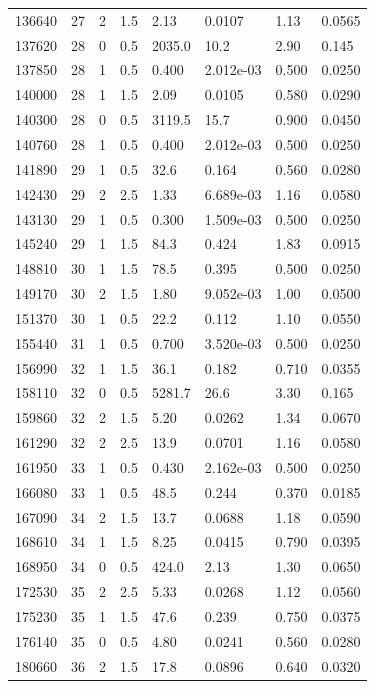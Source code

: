 \documentclass[preview]{standalone}
\begin{document}
{{{\begin{tabular}{L{1.2cm}C{1.2cm} C{0.3cm}C{0.5cm} C{1.4cm}C{1.4cm} C{1.4cm}C{1.4cm}}
  136640  &    27  & 2     & 1.5 &  2.13  & 0.0107  & 1.13 &  0.0565   \\ 
  137620  &    28  & 0     & 0.5 &  2035.0  & 10.2  & 2.90 &  0.145   \\ 
  137850  &    28  & 1     & 0.5 &  0.400  & 2.012e-03  & 0.500 &  0.0250   \\ 
  140000  &    28  & 1     & 1.5 &  2.09  & 0.0105  & 0.580 &  0.0290   \\ 
  140300  &    28  & 0     & 0.5 &  3119.5  & 15.7  & 0.900 &  0.0450   \\ 
  140760  &    28  & 1     & 0.5 &  0.400  & 2.012e-03  & 0.500 &  0.0250   \\ 
  141890  &    29  & 1     & 0.5 &  32.6  & 0.164  & 0.560 &  0.0280   \\ 
  142430  &    29  & 2     & 2.5 &  1.33  & 6.689e-03  & 1.16 &  0.0580   \\ 
  143130  &    29  & 1     & 0.5 &  0.300  & 1.509e-03  & 0.500 &  0.0250   \\ 
  145240  &    29  & 1     & 1.5 &  84.3  & 0.424  & 1.83 &  0.0915   \\ 
  148810  &    30  & 1     & 1.5 &  78.5  & 0.395  & 0.500 &  0.0250   \\ 
  149170  &    30  & 2     & 1.5 &  1.80  & 9.052e-03  & 1.00 &  0.0500   \\ 
  151370  &    30  & 1     & 0.5 &  22.2  & 0.112  & 1.10 &  0.0550   \\ 
  155440  &    31  & 1     & 0.5 &  0.700  & 3.520e-03  & 0.500 &  0.0250   \\ 
  156990  &    32  & 1     & 1.5 &  36.1  & 0.182  & 0.710 &  0.0355   \\ 
  158110  &    32  & 0     & 0.5 &  5281.7  & 26.6  & 3.30 &  0.165   \\ 
  159860  &    32  & 2     & 1.5 &  5.20  & 0.0262  & 1.34 &  0.0670   \\ 
  161290  &    32  & 2     & 2.5 &  13.9  & 0.0701  & 1.16 &  0.0580   \\ 
  161950  &    33  & 1     & 0.5 &  0.430  & 2.162e-03  & 0.500 &  0.0250   \\ 
  166080  &    33  & 1     & 0.5 &  48.5  & 0.244  & 0.370 &  0.0185   \\ 
  167090  &    34  & 2     & 1.5 &  13.7  & 0.0688  & 1.18 &  0.0590   \\ 
  168610  &    34  & 1     & 1.5 &  8.25  & 0.0415  & 0.790 &  0.0395   \\ 
  168950  &    34  & 0     & 0.5 &  424.0  & 2.13  & 1.30 &  0.0650   \\ 
  172530  &    35  & 2     & 2.5 &  5.33  & 0.0268  & 1.12 &  0.0560   \\ 
  175230  &    35  & 1     & 1.5 &  47.6  & 0.239  & 0.750 &  0.0375   \\ 
  176140  &    35  & 0     & 0.5 &  4.80  & 0.0241  & 0.560 &  0.0280   \\ 
  180660  &    36  & 2     & 1.5 &  17.8  & 0.0896  & 0.640 &  0.0320   \\ 
\hline 
\end{tabular} 

}}}
\end{document}
